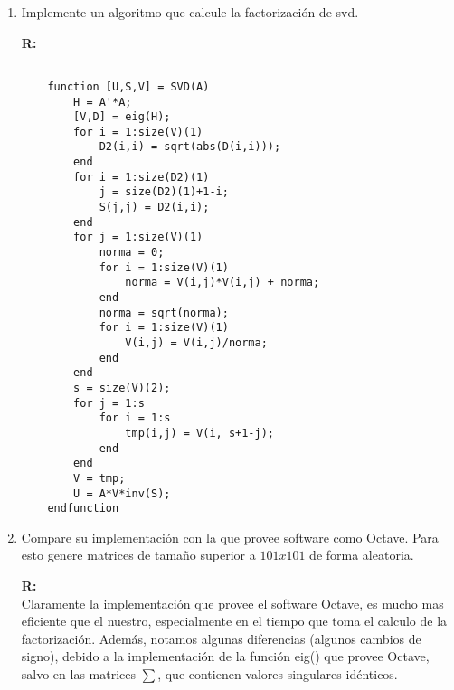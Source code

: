 \begin{enumerate}
	\item Implemente un algoritmo que calcule la factorización de svd.

	\textbf{R:}\\
	\begin{verbatim}

	function [U,S,V] = SVD(A)
		H = A'*A;
		[V,D] = eig(H);
		for i = 1:size(V)(1)
			D2(i,i) = sqrt(abs(D(i,i)));
		end
		for i = 1:size(D2)(1)
			j = size(D2)(1)+1-i;
			S(j,j) = D2(i,i);
		end
		for j = 1:size(V)(1)
			norma = 0;
			for i = 1:size(V)(1)
				norma = V(i,j)*V(i,j) + norma;
			end
			norma = sqrt(norma);
			for i = 1:size(V)(1)
				V(i,j) = V(i,j)/norma;
			end
		end
		s = size(V)(2);
		for j = 1:s
			for i = 1:s
				tmp(i,j) = V(i, s+1-j);
			end
		end
		V = tmp;
		U = A*V*inv(S);
	endfunction
	\end{verbatim}
	\newpage
	\item Compare su implementación con la que provee software como Octave. Para esto genere matrices
de tamaño superior a $101x101$ de forma aleatoria.

	\textbf{R:}\\

	Claramente la implementación que provee el software Octave, es mucho mas eficiente que el nuestro,
	especialmente en el tiempo que toma el calculo de la factorización. Además, notamos algunas
	diferencias (algunos cambios de signo), debido a la implementación de la función eig() que
	provee Octave, salvo en las matrices $\sum$, que contienen valores singulares idénticos.

\end{enumerate}

